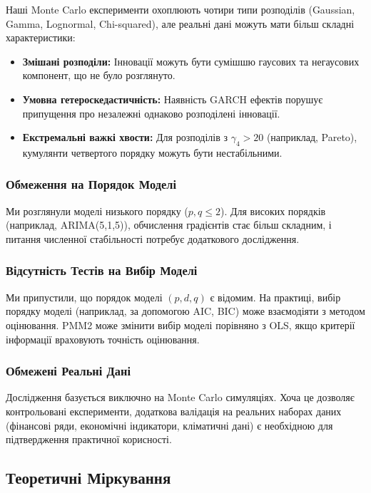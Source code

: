 \documentclass[12pt,a4paper]{article}
\begin{document}
	Наші Monte Carlo експерименти охоплюють чотири типи розподілів (Gaussian, Gamma, Lognormal, Chi-squared), але реальні дані можуть мати більш складні характеристики:
	
	\begin{itemize}
		\item \textbf{Змішані розподіли:} Інновації можуть бути сумішшю гаусових та негаусових компонент, що не було розглянуто.
		\item \textbf{Умовна гетероскедастичність:} Наявність GARCH ефектів порушує припущення про незалежні однаково розподілені інновації.
		\item \textbf{Екстремальні важкі хвости:} Для розподілів з $\gamma_4 > 20$ (наприклад, Pareto), кумулянти четвертого порядку можуть бути нестабільними.
	\end{itemize}
	
	\subsubsection{Обмеження на Порядок Моделі}
	
	Ми розглянули моделі низького порядку ($p, q \leq 2$). Для високих порядків (наприклад, ARIMA(5,1,5)), обчислення градієнтів стає більш складним, і питання численної стабільності потребує додаткового дослідження.
	
	\subsubsection{Відсутність Тестів на Вибір Моделі}
	
	Ми припустили, що порядок моделі $(p, d, q)$ є відомим. На практиці, вибір порядку моделі (наприклад, за допомогою AIC, BIC) може взаємодіяти з методом оцінювання. PMM2 може змінити вибір моделі порівняно з OLS, якщо критерії інформації враховують точність оцінювання.
	
	\subsubsection{Обмежені Реальні Дані}
	
	Дослідження базується виключно на Monte Carlo симуляціях. Хоча це дозволяє контрольовані експерименти, додаткова валідація на реальних наборах даних (фінансові ряди, економічні індикатори, кліматичні дані) є необхідною для підтвердження практичної корисності.
	
	\subsection{Теоретичні Міркування}
	\label{subsec:theoretical_considerations}
	
\end{document}
